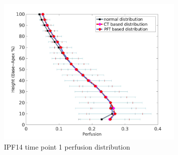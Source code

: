 \begin{figure}[htbp]
\begin{subfigure}{.6\linewidth}
  \includegraphics[width=\linewidth,trim={{.0\wd0} {.0\wd0} {.0\wd0} {.0\wd0}},clip]{Appendix/Image_AppexB/IPF1401/IPF1401_PerfusionAgainstLungHeight.png}
  \caption{IPF14 time point 1 perfusion distribution}
  \label{fig:VQDistribution-b}
\end{subfigure}
\begin{subfigure}{.6\linewidth}%

\end{subfigure}
\end{figure}
